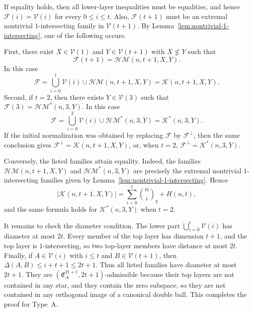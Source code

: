 \documentclass[11pt]{article}
\theoremstyle{definition}
\newcommand{\qbinom}[2]{\genfrac{(}{)}{0pt}{}{#1}{#2}_q}
\begin{document}
If equality holds, then  all lower-layer inequalities must be equalities, and hence $\mathcal F(i)=\mathcal V(i)$ for every $0\le i\le t$. 
Also, $\mathcal F(t+1)$ must be an extremal nontrivial $1$-intersecting family in $\mathcal V(t+1)$. 
By Lemma~\ref{lem:nontrivial-1-intersecting}, one of the following occurs.

First, there exist $X\in\mathcal V(1)$ and $Y\in\mathcal V(t+1)$ with $X\not\le Y$ such that
\[
\mathcal F(t+1)=\mathcal{HM}(n,t+1,X,Y).
\]
In this case
\[
\mathcal F
=
\bigcup_{i=0}^{t}\mathcal V(i)\cup\mathcal{HM}(n,t+1,X,Y)
=
\mathcal K(n,t+1,X,Y).
\]
Second, if $t=2$, then there exists $Y\in\mathcal V(3)$ such that
\(
\mathcal F(3)=\mathcal{HM}^*(n,3,Y).
\)
In this case
\[
\mathcal F
=
\bigcup_{i=0}^{2}\mathcal V(i)\cup\mathcal{HM}^*(n,3,Y)
=
\mathcal K^*(n,3,Y).
\]
If the initial normalization was obtained by replacing $\mathcal F$ by $\mathcal F^\perp$, then the same conclusion gives $\mathcal F^\perp=\mathcal K(n,t+1,X,Y)$, or, when $t=2$, $\mathcal F^\perp=\mathcal K^*(n,3,Y)$.

Conversely, the listed families attain equality. 
Indeed, the families $\mathcal{HM}(n,t+1,X,Y)$ and $\mathcal{HM}^*(n,3,Y)$ are precisely the extremal nontrivial $1$-intersecting families given by Lemma~\ref{lem:nontrivial-1-intersecting}. 
Hence
\[
|\mathcal K(n,t+1,X,Y)|
=
\sum_{i=0}^{t}\qbinom{n}{i}+H(n,t),
\]
and the same formula holds for $\mathcal K^*(n,3,Y)$ when $t=2$.

It remains to check the diameter condition. 
The lower part $\bigcup_{i=0}^{t}\mathcal V(i)$ has diameter at most $2t$. 
Every member of the top layer has dimension $t+1$, and the top layer is $1$-intersecting, so two top-layer members have distance at most $2t$. 
Finally, if $A\in\mathcal V(i)$ with $i\le t$ and $B\in\mathcal V(t+1)$, then $\Delta(A,B)\le i+t+1\le 2t+1$. 
Thus all listed families have diameter at most $2t+1$. 
They are $(\mathfrak E_A^{\mathrm{2t+1}},2t+1)$-admissible because their top layers are not contained in any star, and they contain the zero subspace, so they are not contained in any orthogonal image of a canonical double ball. This completes the proof for Type~A.
\end{document}

